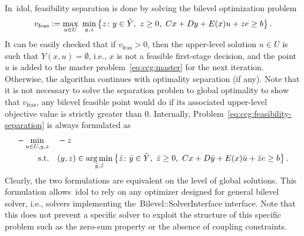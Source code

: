 In~\textsf{idol}, feasibility separation is done by solving the bilevel
optimization problem
%
\begin{equation}
    \label{eq:ccg:feasibility-separation}
    v_\text{feas} \mathrel{{\mathop:}{=}} \max_{u\in U} \ \min_{y,z} \left\{ z \colon
        y\in\tilde{Y}, \ z\ge 0, \ Cx + Dy + E(x)u + ze \ge b
    \right\}.
\end{equation}
It can be easily checked that if $v_\text{feas} > 0$, then the upper-level
solution $u\in U$ is such that $Y(x,u) = \emptyset$, i.e., $x$ is not a
feasible first-stage decision, and the point $u$ is added to the master
problem~\eqref{eq:ccg:master} for the next iteration. Otherwise, the algorithm
continues with optimality separation (if any). Note that it is not necessary
to solve the separation problen to global optimality to show that
$v_\text{feas}$, any bilevel feasible point would do if its associated
upper-level objective value is strictly greater than 0. Internally,
Problem~\eqref{eq:ccg:feasibility-separation} is always formulated as
%
\begin{subequations}
    \begin{align*}
        - \min_{u\in U,y,z} \quad & -z \\
        \text{s.t.} \quad & (y,z) \in \operatorname*{arg\,min}_{\bar{y},\bar{z}} \left\{ \bar{z} \colon
            \bar{y}\in\tilde{Y}, \ \bar{z}\ge 0, \ Cx + D\bar{y} + E(x)\bar{u} + \bar{z}e \ge b
        \right\}.
    \end{align*}
\end{subequations}
Clearly, the two formulations are equivalent on the level of global solutions.
This formulation allows~\textsf{idol} to rely on any optimizer designed for
general bilevel solver, i.e., solvers implementing
the~\textsf{Bilevel::SolverInterface} interface. Note that this does not
prevent a specific solver to exploit the structure of this specific problem
such as the zero-sum property or the absence of coupling constraints.

